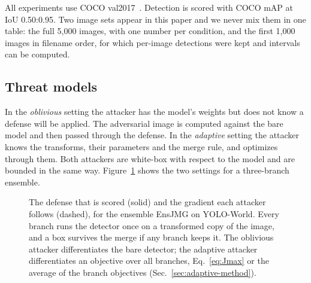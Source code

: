\documentclass[11pt]{article}
\newcommand{\yw}{YOLO-World}
\begin{document}
All experiments use COCO val2017~\cite{lin2014microsoft}. Detection is scored
with COCO mAP at IoU 0.50:0.95. Two image sets appear in this paper and we
never mix them in one table: the full 5{,}000 images, with one number per
condition, and the first 1{,}000 images in filename order, for which
per-image detections were kept and intervals can be computed.

\subsection{Threat models}

In the \emph{oblivious} setting the attacker has the model's weights but does
not know a defense will be applied. The adversarial image is computed against
the bare model and then passed through the defense. In the \emph{adaptive}
setting the attacker knows the transforms, their parameters and the merge
rule, and optimizes through them. Both attackers are white-box with respect
to the model and are bounded in the same way. Figure~\ref{fig:pipeline}
shows the two settings for a three-branch ensemble.

\begin{figure}[t]
\centering
{}
\caption{The defense that is scored (solid) and the gradient each attacker
follows (dashed), for the ensemble EnsJMG on \yw{}. Every branch runs the
detector once on a transformed copy of the image, and a box survives the
merge if any branch keeps it. The oblivious attacker differentiates the bare
detector; the adaptive attacker differentiates an objective over all
branches, Eq.~\ref{eq:Jmax} or the average of the branch objectives
(Sec.~\ref{sec:adaptive-method}).}
\label{fig:pipeline}
\end{figure}
\end{document}
